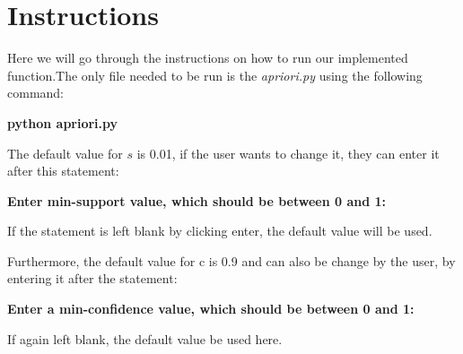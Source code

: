 \documentclass[a4paper, 11pt]{article}
\begin{document}
\section{Instructions}
Here we will go through the instructions on how to run our implemented function.The only file needed to be run is the \textit{apriori.py} using the following command: 

\textbf{python apriori.py}


The default value for $s$ is 0.01, if the user wants to change it, they can enter it after this statement: 

\textbf{Enter min-support value, which should be between 0 and 1:} 

If the statement is left blank by clicking enter, the default value will be used.

Furthermore, the default value for c is 0.9 and can also be change by the user, by entering it after the statement: 

\textbf{Enter a min-confidence value, which should be between 0 and 1:} 

If again left blank, the default value be used here.
\end{document}
